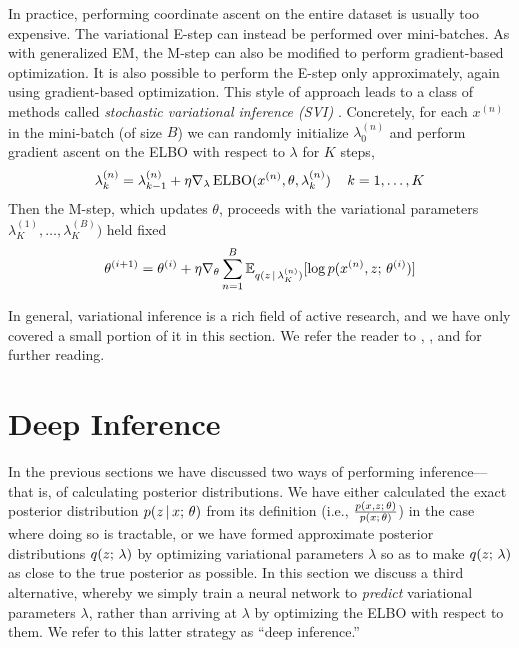 \documentclass{article}
\begin{document}
In practice, performing coordinate ascent on the entire dataset is usually too expensive. The variational E-step can instead be performed over mini-batches.
As with generalized EM, the M-step can also be modified to perform gradient-based
optimization. It is also possible to perform the E-step only approximately, again using gradient-based optimization. This style of approach leads to a class of methods called \emph{stochastic variational inference (SVI)} \citep{Hoffman2013}. Concretely, 
for each $x^{(n)}$ in the mini-batch (of size $B$) 
we can randomly initialize $\lambda_0^{(n)}$ and 
perform gradient ascent on the ELBO with respect to $\lambda$ for $K$ steps,
\[ \lambda_{k}^{(n)} = \lambda_{k-1}^{(n)} + \eta \nabla_\lambda \operatorname*{ELBO}(x^{(n)}, \theta, \lambda^{(n)}_k) \,\,\,\,\,\,\, k = 1, \dots, K \]
Then the M-step, which updates $\theta$, proceeds with the variational parameters $\lambda_K^{(1)}, \dots,\lambda_K^{(B)})$ held fixed
\[ \theta^{(i+1)} = \theta^{(i)} + \eta \nabla_\theta \sum_{n=1}^B \mathbb{E}_{q(z \,|\, \lambda_K^{(n)})}[\log p(x^{(n)}, z ; \, \theta^{(i)})]\]

In general, variational inference is a rich field of active research, and we have only covered a small portion of it in this section. We refer the reader to \cite{Wainwright2008}, \cite{Blei2017}, and \cite{Zhang2017} for further reading.

\section{Deep Inference}\label{deepinf}
In the previous sections we have discussed two ways of performing inference---that is, of calculating posterior distributions. We have either calculated the exact posterior distribution $p(z \,|\, x ; \, \theta)$ from its definition (i.e., $\frac{p(x, z ; \, \theta)}{p(x ; \, \theta)}$) in the case where doing so is tractable, or we have formed approximate posterior distributions $q(z ; \, \lambda)$ by optimizing variational parameters $\lambda$ so as to make $q(z ; \, \lambda)$ as close to the true posterior as possible. In this section we discuss a third alternative, whereby we simply train a neural network to \textit{predict} variational parameters $\lambda$, rather than arriving at $\lambda$ by optimizing the ELBO with respect to them. We refer to this latter strategy as ``deep inference.''
\end{document}
